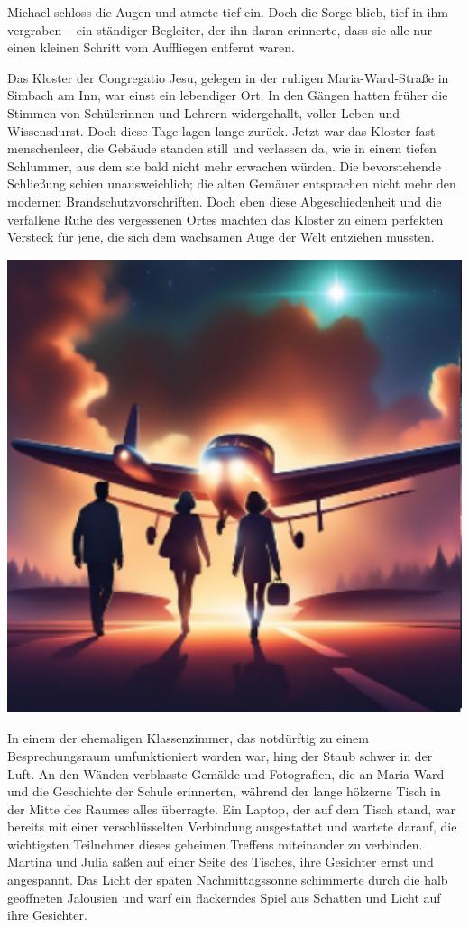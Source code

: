 \documentclass[
]{article}
\begin{document}
Michael schloss die Augen und atmete tief ein. Doch die Sorge blieb,
tief in ihm vergraben -- ein ständiger Begleiter, der ihn daran
erinnerte, dass sie alle nur einen kleinen Schritt vom Auffliegen
entfernt waren.

Das Kloster der Congregatio Jesu, gelegen in der ruhigen
Maria-Ward-Straße in Simbach am Inn, war einst ein lebendiger Ort. In
den Gängen hatten früher die Stimmen von Schülerinnen und Lehrern
widergehallt, voller Leben und Wissensdurst. Doch diese Tage lagen lange
zurück. Jetzt war das Kloster fast menschenleer, die Gebäude standen
still und verlassen da, wie in einem tiefen Schlummer, aus dem sie bald
nicht mehr erwachen würden. Die bevorstehende Schließung schien
unausweichlich; die alten Gemäuer entsprachen nicht mehr den modernen
Brandschutzvorschriften. Doch eben diese Abgeschiedenheit und die
verfallene Ruhe des vergessenen Ortes machten das Kloster zu einem
perfekten Versteck für jene, die sich dem wachsamen Auge der Welt
entziehen mussten.

\includegraphics[width=5.65625in,height=5.25in]{media/image7.png}

In einem der ehemaligen Klassenzimmer, das notdürftig zu einem
Besprechungsraum umfunktioniert worden war, hing der Staub schwer in der
Luft. An den Wänden verblasste Gemälde und Fotografien, die an Maria
Ward und die Geschichte der Schule erinnerten, während der lange
hölzerne Tisch in der Mitte des Raumes alles überragte. Ein Laptop, der
auf dem Tisch stand, war bereits mit einer verschlüsselten Verbindung
ausgestattet und wartete darauf, die wichtigsten Teilnehmer dieses
geheimen Treffens miteinander zu verbinden. Martina und Julia saßen auf
einer Seite des Tisches, ihre Gesichter ernst und angespannt. Das Licht
der späten Nachmittagssonne schimmerte durch die halb geöffneten
Jalousien und warf ein flackerndes Spiel aus Schatten und Licht auf ihre
Gesichter.
\end{document}
